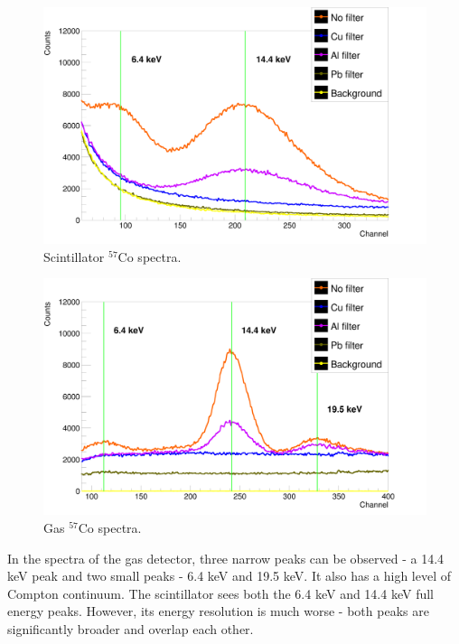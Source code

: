 \begin{figure}[H]
\centering
\includegraphics[scale=0.125, angle = 0]{./pictures/PMTSpectre.png}
\caption{Scintillator $^{57}$Co spectra.}
\label{Scintillator detector spectra.}
\end{figure}
\begin{figure}[H]
\centering
\includegraphics[scale=0.125, angle = 0]{./pictures/GasSpectre.png}
\caption{Gas $^{57}$Co spectra.}
\label{Gas detector spectra.}
\end{figure}
In the spectra of the gas detector, three narrow peaks can be observed - a 14.4 keV peak and two small peaks - 6.4 keV and 19.5 keV. It also has a high level of Compton continuum.
The scintillator sees both the 6.4 keV and 14.4 keV full energy peaks. However, its energy resolution is much worse - both peaks are significantly broader and overlap each other.

